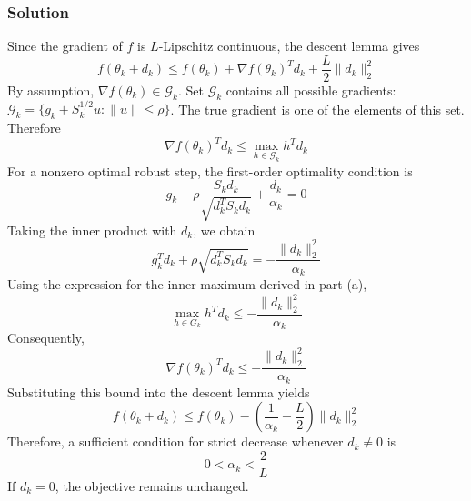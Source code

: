 \subsubsection{Solution}
Since the gradient of $f$ is $L$-Lipschitz continuous, the descent lemma gives
$$f(\theta_k + d_k) \leq f(\theta_k) + \nabla f(\theta_k)^T d_k + \frac{L}{2} \|d_k\|^2_2$$
By assumption, $\nabla f(\theta_k) \in \mathcal{G}_k$. Set $\mathcal{G}_k$ contains all possible gradients: $\mathcal{G}_k = \{g_k + S^{1/2}_k u: \|u\| \leq \rho\}$. The true gradient is one of the elements of this set. Therefore 
$$\nabla f(\theta_k)^T d_k \leq \max_{h \in \mathcal{G}_k} h^T d_k$$
For a nonzero optimal robust step, the first-order optimality condition is
$$g_k + \rho\frac{S_k d_k}{\sqrt{d^T_k S_k d_k}} + \frac{d_k}{\alpha_k} = 0$$
Taking the inner product with $d_k$, we obtain
$$g^T_k d_k + \rho \sqrt{d^T_k S_k d_k} = -\frac{\|d_k\|^2_2}{\alpha_k}$$
Using the expression for the inner maximum derived in part (a),
$$\max_{h \in G_k} h^T d_k \leq -\frac{\|d_k\|^2_2}{\alpha_k}$$
Consequently,
$$\nabla f(\theta_k)^T d_k \leq -\frac{\|d_k\|^2_2}{\alpha_k}$$
Substituting this bound into the descent lemma yields
$$f(\theta_k + d_k) \leq f(\theta_k) - \left(\frac{1}{\alpha_k} - \frac{L}{2}\right) \|d_k\|^2_2$$
Therefore, a sufficient condition for strict decrease whenever $d_k \neq 0$ is
$$0 < \alpha_k < \frac{2}{L}$$
If $d_k = 0$, the objective remains unchanged.